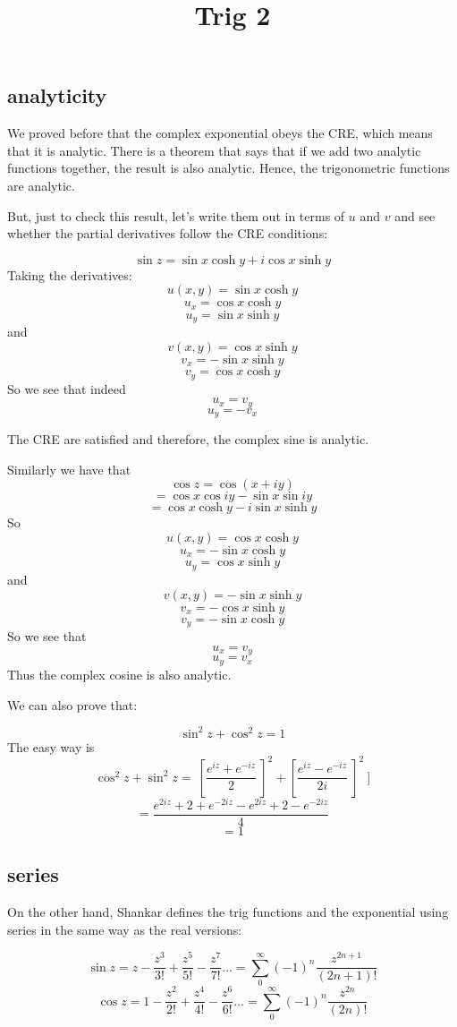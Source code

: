 \documentclass[11pt, oneside]{article}
\title{Trig 2}
\date{}
\begin{document}
\maketitle
\Large

\subsection*{analyticity}
We proved before that the complex exponential obeys the CRE, which means that it is analytic.  There is a theorem that says that if we add two analytic functions together, the result is also analytic.  Hence, the trigonometric functions are analytic.

But, just to check this result, let's write them out in terms of $u$ and $v$ and see whether the partial derivatives follow the CRE conditions:

\[ \sin z = \sin x \cosh y + i \cos x \sinh y \]
Taking the derivatives:
\[ u(x,y) =  \sin x \cosh y \]
\[ u_x = \cos x \cosh y \]
\[ u_y = \sin x \sinh y \]
and
\[ v(x,y) = \cos x \sinh y \]
\[ v_x = - \sin x \sinh y \]
\[ v_y = \cos x \cosh y \]
So we see that indeed
\[ u_x = v_y \]
\[ u_y = -v_x \]

The CRE are satisfied and therefore, the complex sine is analytic.

Similarly we have that 
\[ \cos z = \cos (x + iy) \]
\[ = \cos x \cos iy - \sin x \sin iy \]
\[ = \cos x \cosh y - i \sin x \sinh y \]
So
\[ u(x,y) =  \cos x \cosh y \]
\[ u_x = - \sin x \cosh y \]
\[ u_y = \cos x \sinh y \]
and
\[ v(x,y) = -\sin x \sinh y \]
\[ v_x = -\cos x \sinh y \]
\[ v_y = -\sin x \cosh y \]
So we see that
\[ u_x = v_y \]
\[ u_y = v_x \]
Thus the complex cosine is also analytic.

We can also prove that:

\[ \sin^2 z + \cos^2 z = 1 \]
The easy way is
\[ \cos^2 z + \sin^2 z = \ [ \frac{e^{iz} + e^{-iz}}{2} \ ]^2 +  [ \frac{e^{iz} - e^{-iz}}{2i} \ ]^2 \ ] \]
\[= \frac{e^{2iz} + 2 + e^{-2iz} - e^{2iz} + 2 - e^{-2iz} }{4} \]
\[ = 1 \]

\subsection*{series}
On the other hand, Shankar defines the trig functions and the exponential using series in the same way as the real versions:

\[ \sin z = z - \frac{z^3}{3!} + \frac{z^5}{5!} - \frac{z^7}{7!} \dots = \sum_0^{\infty} (-1)^n \frac{z^{2n+1}}{(2n +1)!} \]
\[ \cos z = 1 - \frac{z^2}{2!} + \frac{z^4}{4!} - \frac{z^6}{6!} \dots = \sum_0^{\infty} (-1)^n \frac{z^{2n}}{(2n)!} \]
\end{document}
